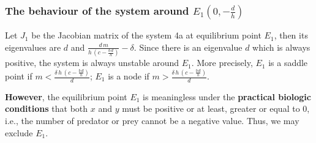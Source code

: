 \documentclass{article}
\begin{document}
\subsubsection{The behaviour of the system around $E_{1}(0,-\frac{d}{h})$}
Let $J_{1}$ be the Jacobian matrix of the system 4a at equilibrium
point $E_{1}$, then its eigenvalues are $d$ and $\frac{d\,m}{h\,\left(c-\frac{b\,d}{h}\right)}-\delta$. 
Since there is an eigenvalue $d$ which is always positive, the system is always unstable 
around $E_{1}$. More precisely, $E_{1}$ is a saddle point if $m<\frac{\delta\,h\,\left(c-\frac{b\,d}{h}\right)}{d}$;
$E_{1}$ is a node if $m>\frac{\delta\,h\,\left(c-\frac{b\,d}{h}\right)}{d}$.
\par \textbf{However}, the equilibrium point $E_{1}$ is meaningless under the \textbf{practical biologic conditions} that both $x$ and $y$ must be positive or at least, greater or equal to $0$, i.e., the number of predator or prey cannot be a negative value. Thus, we may exclude $E_{1}$.\\
\end{document}
